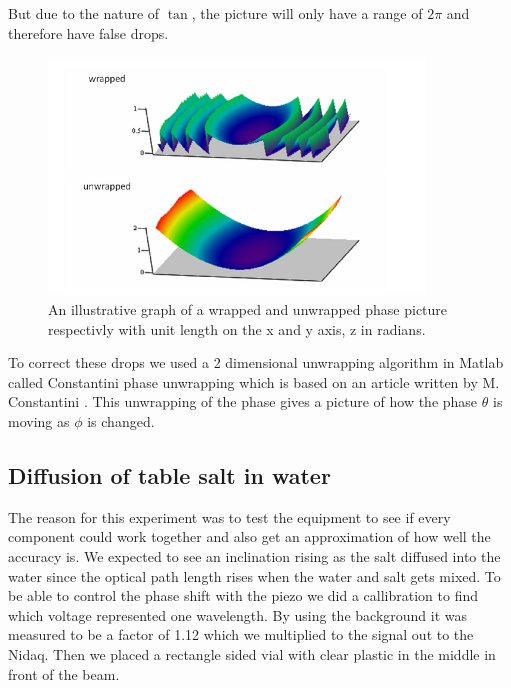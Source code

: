 But due to the nature of $\tan$, the picture will only have a range of $2\pi$
and therefore have false drops. 
\begin {figure}[ht!]
\includegraphics [width=10cm]{bilder/unwrap.png}
\caption {\cite{omst}An illustrative graph of a wrapped and unwrapped phase picture respectivly 
with unit length on the x and y axis, z in radians.}
\label {unwrap}
\end {figure}
To correct these drops we used a 2 dimensional unwrapping algorithm in Matlab called
Constantini phase unwrapping \cite{bl} which is based on an article written by M. Constantini 
\cite{const}. This unwrapping of the phase gives a picture of how the phase $\theta$ is moving
as $\phi$ is changed. 

\subsection {Diffusion of table salt in water}

The reason for this experiment was to test the equipment to see if every component
could work together and also get an approximation of how well the accuracy is.
We expected to see an inclination rising as the salt diffused into the water since
the optical path length rises when the water and salt gets mixed.
To be able to control the phase shift with the piezo we did a callibration to find
which voltage represented one wavelength. By using the background it was measured to
be a factor of 1.12 which we multiplied to the signal out to the Nidaq. Then we placed a rectangle 
sided vial with clear plastic in the middle in front of the beam.

